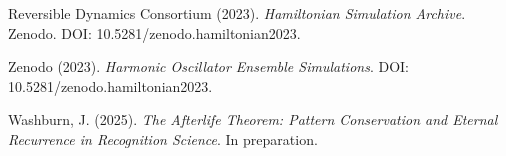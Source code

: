 \documentclass[11pt,letterpaper]{article}
\theoremstyle{definition}
\theoremstyle{remark}
\begin{document}
\begin{thebibliography}{99}
Reversible Dynamics Consortium (2023). \emph{Hamiltonian Simulation Archive}. Zenodo. DOI: 10.5281/zenodo.hamiltonian2023.

Zenodo (2023). \emph{Harmonic Oscillator Ensemble Simulations}. DOI: 10.5281/zenodo.hamiltonian2023.

Washburn, J. (2025). \emph{The Afterlife Theorem: Pattern Conservation and Eternal Recurrence in Recognition Science}. In preparation.

\end{thebibliography}
\end{document}
